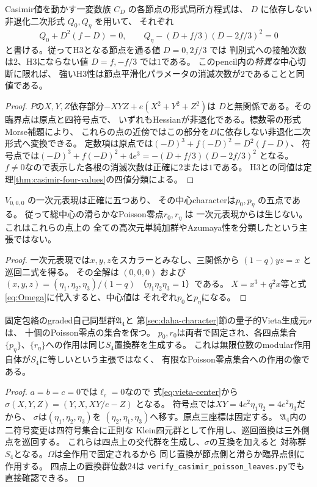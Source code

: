 \begin{proposition}[結節点の平滑化における二次接触と一次横断]
\label{prop:casimir-smoothing-orders}
Casimir値を動かす一変数族 $C_D$ の各節点の形式局所方程式は、
$D$ に依存しない非退化二次形式 $Q_0,Q_\eta$ を用いて、
それぞれ
\[
 Q_0+D^2(f-D)=0,\qquad
 Q_\eta-(D+f/3)(D-2f/3)^2=0
\]
と書ける。従ってH3となる節点を通る値 $D=0,2f/3$ では
判別式への接触次数は$2$、H3にならない値 $D=f,-f/3$ では$1$である。
このpencil内の\emph{特異な}中心切断に限れば、
強いH3性は節点平滑化パラメータの消滅次数が$2$であることと同値である。
\end{proposition}
\begin{proof}
$P$の$X,Y,Z$依存部分$-XYZ+e(X^2+Y^2+Z^2)$は
$D$と無関係である。その臨界点は原点と四符号点で、
いずれもHessianが非退化である。標数零の形式Morse補題により、
これらの点の近傍ではこの部分を$D$に依存しない非退化二次形式へ変換できる。
定数項は原点では$(-D)^3+f(-D)^2=D^2(f-D)$、
符号点では$(-D)^3+f(-D)^2+4e^3
=-(D+f/3)(D-2f/3)^2$ となる。
$f\ne0$なので表示した各根の消滅次数は正確に$2$または$1$である。
H3との同値は定理\ref{thm:casimir-four-values}の四値分類による。
\end{proof}

\begin{corollary}[一次元表現が検出する五つのPoisson零点]
\label{cor:one-dim-five-of-ten}
$V_{0,0,0}$ の一次元表現は正確に五つあり、
その中心characterは$p_0,p_\eta$ の五点である。
従って総中心の滑らかなPoisson零点$r_0,r_\eta$ は
一次元表現からは生じない。これはこれらの点上の
全ての高次元単純加群やAzumaya性を分類したという主張ではない。
\end{corollary}
\begin{proof}
一次元表現では$x,y,z$をスカラーとみなし、三関係から
$(1-q)yz=x$ と巡回二式を得る。
その全解は $(0,0,0)$ および
$(x,y,z)=(\eta_1,\eta_2,\eta_3)/(1-q)$
（$\eta_1\eta_2\eta_3=1$）である。
$X=x^3+q^2x$等と式\eqref{eq:Omega}に代入すると、中心値は
それぞれ$p_0$と$p_\eta$になる。
\end{proof}

\begin{corollary}
\label{cor:poisson-ten-s4}
固定包絡のgraded自己同型群$\mathfrak A_4$と
第\ref{sec:daha-character}節の量子的Vieta生成元$\sigma$は、
十個のPoisson零点の集合を保つ。
$p_0,r_0$は両者で固定され、各四点集合
$\{p_\eta\}$、$\{r_\eta\}$への作用は同じ$S_4$置換群を生成する。
これは無限位数のmodular作用自体が$S_4$に等しいという主張ではなく、
有限なPoisson零点集合への作用の像である。
\end{corollary}
\begin{proof}
$a=b=c=0$では$\ell_c=0$なので
式\eqref{eq:vieta-center}から
$\sigma(X,Y,Z)=(Y,X,XY/e-Z)$ となる。
符号点では$XY=4e^2\eta_1\eta_2=4e^2\eta_3$だから、
$\sigma$は$(\eta_1,\eta_2,\eta_3)$を
$(\eta_2,\eta_1,\eta_3)$へ移す。原点三座標は固定する。
$\mathfrak A_4$内の二符号変更は四符号集合に正則な
Klein四元群として作用し、巡回置換は三外側点を巡回する。
これらは四点上の交代群を生成し、$\sigma$の互換を加えると
対称群$S_4$となる。$\Omega$は全作用で固定されるから
同じ置換が節点側と滑らか臨界点側に作用する。
四点上の置換群位数24は
\texttt{verify\_casimir\_poisson\_leaves.py}でも直接確認できる。
\end{proof}

